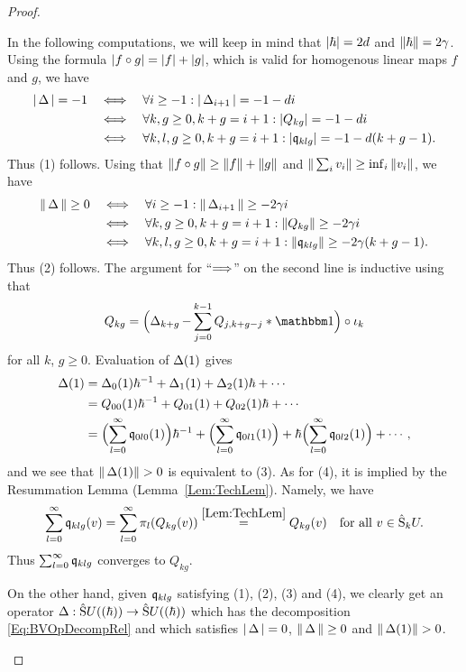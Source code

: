 \documentclass[\MainFolder/Text.tex]{subfiles}
\begin{document}
\begin{proof}
\begin{ProofList}
In the following computations, we will keep in mind that $|\hbar| = 2d$ and $\| \hbar \| = 2\gamma$. Using the formula $|f \circ g| = |f| + |g|$, which is valid for homogenous linear maps $f$ and $g$, we have 
\begin{align*}
|\operatorname{\Delta}|=-1 &\quad\Longleftrightarrow\quad\forall i\ge -1: |\operatorname{\Delta}_{i+1}| = -1 - d i \\
&\quad\Longleftrightarrow\quad\forall k, g \ge 0, k + g = i+1: |Q_{kg}| = - 1 - di \\
&\quad\Longleftrightarrow\quad\forall k, l, g \ge 0, k+g=i+1: |\mathfrak{q}_{klg}| = - 1 - d(k+g-1).
\end{align*}
Thus (1) follows. Using that $\| f\circ g \| \ge \| f \| + \| g \|$ and $\| \sum_i v_i \|\ge \inf_i \| v_i \|$, we have
\begin{align*}
\| \operatorname{\Delta} \|\ge 0 &\quad\Longleftrightarrow\quad\forall i\ge -1: \| \operatorname{\Delta}_{i+1} \| \ge -2\gamma i \\
 &\quad\Longleftrightarrow\quad\forall k, g \ge 0, k+g=i+1: \| Q_{kg} \| \ge -2\gamma i \\
 &\quad\Longleftrightarrow\quad\forall k, l, g \ge 0, k+g=i+1: \| \mathfrak{q}_{klg} \| \ge -2\gamma (k+g-1).
\end{align*}
Thus (2) follows. The argument for ``$\Longrightarrow$'' on the second line is inductive using that
$$ Q_{kg} = \Bigl(\BVOp_{k+g} - \sum_{j=0}^{k-1} Q_{j, k+g - j} \Star \Id\Bigr)\circ\iota_k $$
for all $k$, $g\ge 0$. Evaluation of $\operatorname{\Delta}(1)$ gives
\begin{align*}
\operatorname{\Delta}(1)&=\operatorname{\Delta}_0(1)\hbar^{-1}+\operatorname{\Delta}_1(1)+\operatorname{\Delta}_2(1)\hbar+\dotsb \\
        &=Q_{00}(1)\hbar^{-1}+Q_{01}(1)+Q_{02}(1)\hbar+\dotsb \\
& = \Bigl(\sum_{l=0}^\infty \mathfrak{q}_{0l0}(1) \Bigr)\hbar^{-1} +  \Bigl(\sum_{l=0}^\infty \mathfrak{q}_{0l1}(1)\Bigr) + \hbar\Bigl(\sum_{l=0}^\infty \mathfrak{q}_{0l2}(1)\Bigr) + \dotsb,
\end{align*}
and we see that $\Norm{\BVOp(1)}>0$ is equivalent to (3). As for (4), it is implied by the Resummation Lemma (Lemma~\ref{Lem:TechLem}). Namely, we have 
$$ \sum_{l=0}^\infty \mathfrak{q}_{klg}(v) = \sum_{l=0}^\infty \pi_l(Q_{kg}(v)) \overset{\ref{Lem:TechLem}}{=} Q_{kg}(v)\quad \text{for all }v\in \hat{\mathrm{S}}_k U. $$
Thus $\sum_{l=0}^\infty \mathfrak{q}_{klg}$ converges to $Q_{kg}$.

On the other hand, given $\mathfrak{q}_{klg}$ satisfying (1), (2), (3) and (4), we clearly get an operator $\operatorname{\Delta}: \hat{\mathrm{S}}U((\hbar))\rightarrow\hat{\mathrm{S}}U((\hbar))$ which has the decomposition \eqref{Eq:BVOpDecompRel} and which satisfies $|\operatorname{\Delta}| = 0$, $\| \operatorname{\Delta} \|\ge 0$ and $\Norm{\BVOp(1)}>0$.


\end{ProofList}
\end{proof}
\end{document}
